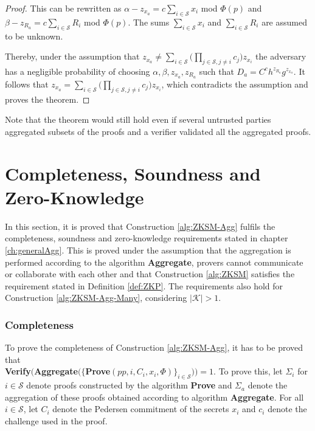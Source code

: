 \begin{proof}
This can be rewritten as $\alpha-z_{x_a} =  c \sum_{i\in\mathcal{S}} x_i$ mod $\Phi(p)$ and  $\beta-z_{R_a} =  c \sum_{i\in\mathcal{S}} R_i$ mod $\Phi(p)$. The sums $ \sum_{i\in\mathcal{S}} x_i$ and $ \sum_{i\in\mathcal{S}} R_i$ are assumed to be unknown.  

Thereby, under the assumption that $z_{x_a}\neq \sum_{i\in\mathcal{S}} \Big( \prod_{j\in\mathcal{S}, j\neq i} c_j \big) z_{x_i} $ the adversary has a negligible probability of choosing $\alpha,\beta,z_{x_a},z_{R_a}$ such that $D_a= C^ch^{z_{R_a}}g^{z_{x_a}}$. It follows that  $z_{x_a} = \sum_{i\in\mathcal{S}} \Big( \prod_{j\in\mathcal{S}, j\neq i} c_j \big) z_{x_i}$, which contradicts the assumption and proves the theorem. 


\end{proof}
Note that the theorem would still hold even if several untrusted parties aggregated subsets of the proofs and a verifier validated all the aggregated proofs. 

\section{Completeness, Soundness and Zero-Knowledge}
\label{sec:CSZKAgg}
In this section, it is proved that Construction \ref{alg:ZKSM-Agg}  fulfils the completeness, soundness and zero-knowledge requirements stated in chapter \ref{ch:generalAgg}. This is proved under the  assumption that the aggregation is performed according to the algorithm \textbf{Aggregate},  provers cannot communicate or collaborate with each other and that Construction \ref{alg:ZKSM} satisfies the requirement stated in Definition \ref{def:ZKP}.
 The requirements also hold for Construction \ref{alg:ZKSM-Agg-Many}, considering $|\mathcal{K}|>1$.

\subsubsection*{Completeness}
To prove the completeness of Construction \ref{alg:ZKSM-Agg}, it has to be proved that\\ \textbf{Verify}$ ( $\textbf{Aggregate}$ (\{ $\textbf{Prove}$ (pp,i,C_i,x_i,\Phi)\}_{i\in\mathcal{S}}) )= 1$. To prove this, let $\Sigma_i$ for $i\in\mathcal{S}$ denote proofs constructed by the algorithm \textbf{Prove} and $\Sigma_a $ denote the aggregation of these proofs obtained according to algorithm \textbf{Aggregate}. For all $i\in\mathcal{S}$, let $C_i$ denote the Pedersen commitment of the secrets $x_i$ and $c_i$ denote the challenge used in the proof.

